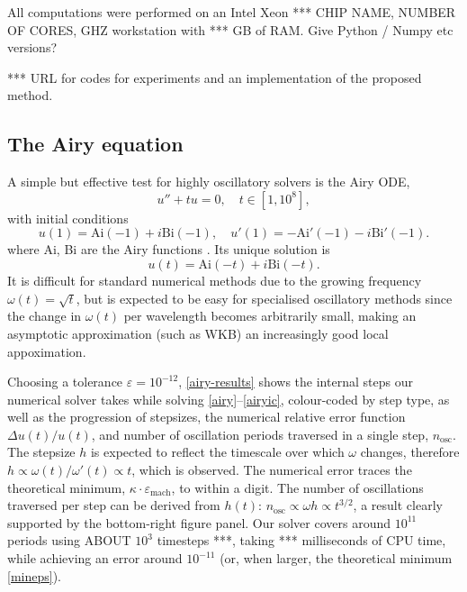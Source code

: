 \documentclass[10pt]{article}
\newcommand{\be}{\begin{equation}}
\newcommand{\ee}{\end{equation}}
\newcommand{\veps}{\varepsilon}
\newcommand{\om}{\omega}
\newcommand{\AB}[1]{{\color{orange}#1}}
\begin{document}
All computations were performed on an Intel Xeon *** CHIP NAME,
NUMBER OF CORES, GHZ workstation with *** GB of RAM.
Give Python / Numpy etc versions?

*** URL for codes for experiments and an implementation of the proposed
method.


\subsection{The Airy equation}\label{airy-demo}

A simple but effective test for highly oscillatory solvers is the Airy ODE,
\be
u'' + tu = 0, \quad t \in [1, 10^8],
\label{airy}
\ee
with initial conditions
\be
u(1) = \text{Ai}(-1) + i\text{Bi}(-1), \quad u'(1) = - \text{Ai}'(-1) -i\text{Bi}'(-1).
\label{airyic}
\ee
where Ai, Bi are the Airy functions \cite[Chapter~9]{DLMFairy}.
Its unique solution is
\be
u(t) = \text{Ai}(-t) + i\text{Bi}(-t).
\ee
It is difficult
for standard numerical methods due to the growing frequency $\om(t) = \sqrt{t}$,
but is expected
to be easy for specialised oscillatory methods since the change in $\om(t)$ per wavelength becomes arbitrarily small, making an asymptotic approximation (such as WKB) 
an increasingly good local appoximation.


Choosing a tolerance $\veps=10^{-12}$,
\cref{airy-results} shows the
internal steps our numerical solver takes while solving
\eqref{airy}--\eqref{airyic},
colour-coded by step type, as well as the progression of stepsizes,
the numerical relative error function $\Delta u(t)/u(t)$,
and number of oscillation periods traversed in a single step,
$n_{\text{osc}}$.
The
stepsize $h$ is expected to reflect the timescale over which $\om$ changes,
therefore $h \propto \om(t)/\om'(t) \propto t$, which is observed.
The numerical
error traces the theoretical minimum, $\kappa \cdot \varepsilon_{\text{mach}}$, to
within a digit. The number of oscillations traversed per step can be derived
from $h(t)$: $n_{\text{osc}} \propto \om h \propto t^{3/2}$,
a result clearly supported by the bottom-right figure panel.
Our solver covers around $10^{11}$ periods using ABOUT $10^3$ timesteps ***,
taking *** milliseconds of CPU time,
while achieving an error around $10^{-11}$ (or, when larger, the theoretical
minimum \eqref{mineps}).
\end{document}
